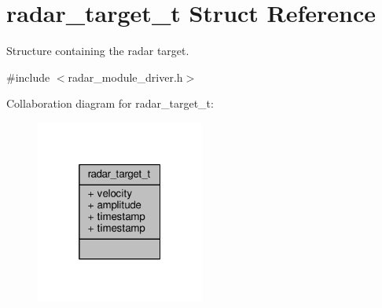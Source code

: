 \hypertarget{structradar__target__t}{\section{radar\+\_\+target\+\_\+t Struct Reference}
\label{structradar__target__t}
}


Structure containing the radar target.  




{\ttfamily \#include $<$radar\+\_\+module\+\_\+driver.\+h$>$}



Collaboration diagram for radar\+\_\+target\+\_\+t\+:
\nopagebreak
\begin{figure}[H]
\begin{center}
\leavevmode
\includegraphics[width=157pt]{structradar__target__t__coll__graph}
\end{center}
\end{figure}
